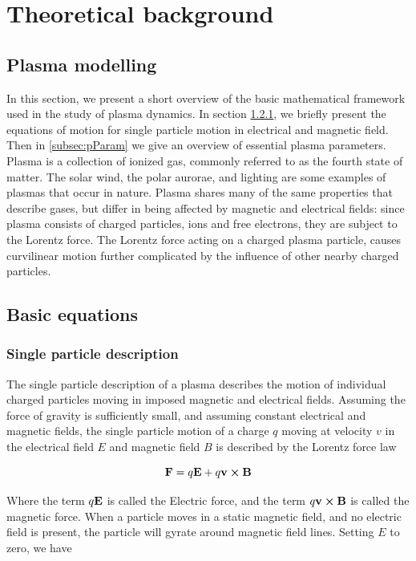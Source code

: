 \chapter{Theoretical background}

\label{sec:theory}

\section{Plasma modelling}
In this section, we present a short overview of the basic mathematical framework used in the study of plasma dynamics. In section \cref{subsec:basicEq}, we briefly present the equations of motion for single particle motion in electrical and magnetic field. Then in \cref{subsec:pParam} we give an overview of essential plasma parameters.
Plasma is a collection of ionized gas, commonly referred to as the fourth state of matter. The solar wind, the polar aurorae, and lighting are some examples of plasmas that occur in nature.  Plasma shares many of the same properties that describe gases, but differ in being affected by magnetic and electrical fields: since plasma consists of charged particles, ions and free electrons, they are subject to the Lorentz force. The Lorentz force acting on a charged plasma particle, causes curvilinear motion further complicated by the influence of other nearby charged particles.

\section{Basic equations}

\subsection{Single particle description}
\label{subsec:basicEq}
The single particle description of a plasma describes the motion of individual charged particles moving in imposed magnetic and electrical fields. Assuming the force of gravity is sufficiently small, and assuming constant electrical and magnetic fields, the single particle motion of a charge $q$ moving at velocity $v$ in the electrical field $E$ and magnetic field $B$ is described by the Lorentz force law 

\begin{equation}\label{eq:lorentz}
    \vb{F} = q \vb{E} + q \vb{v} \cp \vb{B}
\end{equation}

Where the term $q \vb{E}$ is called the Electric force, and the term $q\vb{v} \cp \vb{B}$ is called the magnetic force. When a particle moves in a static magnetic field, and no electric field is present, the particle will gyrate around magnetic field lines. Setting $E$ to zero, we have

